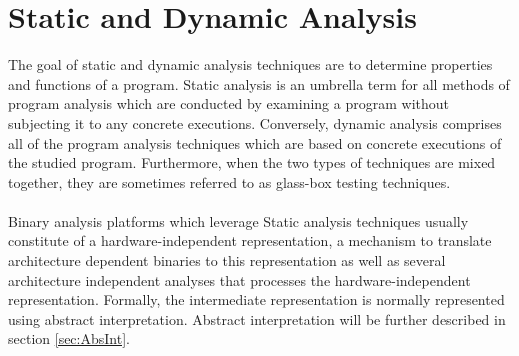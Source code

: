 \documentclass{kththesis}
\begin{document}


\section{Static and Dynamic Analysis}
The goal of static and dynamic analysis techniques are to determine properties and
functions of a program\cite{staticOfInd}. Static analysis is an umbrella term for all methods of program analysis which are conducted by examining a program without subjecting it to any concrete executions. Conversely, dynamic analysis comprises all of the program analysis techniques which are based on concrete executions of the studied program. Furthermore, when the two types of techniques are mixed together, they are sometimes referred to as glass-box testing techniques\cite{DefinitionStaticAnal}.
\\ \\
Binary analysis platforms which leverage Static analysis techniques usually constitute of a hardware-independent representation, a mechanism to translate architecture dependent binaries to this representation as well as several architecture independent analyses that processes the hardware-independent representation\cite{TrABin}. Formally, the intermediate representation is normally represented using abstract interpretation\cite{Jakstab}. Abstract interpretation will be further described in section \ref{sec:AbsInt}.
\end{document}
